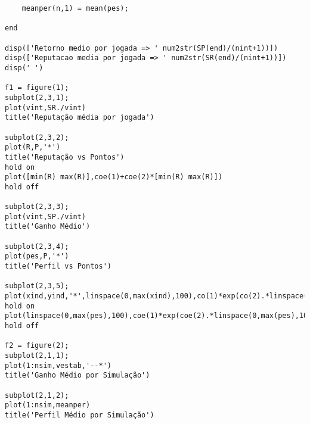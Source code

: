 {\begin{verbatim}
    meanper(n,1) = mean(pes);
    
end

disp(['Retorno medio por jogada => ' num2str(SP(end)/(nint+1))])
disp(['Reputacao media por jogada => ' num2str(SR(end)/(nint+1))])
disp(' ')

f1 = figure(1);
subplot(2,3,1);
plot(vint,SR./vint)
title('Reputação média por jogada')

subplot(2,3,2);
plot(R,P,'*')
title('Reputação vs Pontos')
hold on
plot([min(R) max(R)],coe(1)+coe(2)*[min(R) max(R)])
hold off

subplot(2,3,3);
plot(vint,SP./vint)
title('Ganho Médio')

subplot(2,3,4);
plot(pes,P,'*')
title('Perfil vs Pontos')

subplot(2,3,5);
plot(xind,yind,'*',linspace(0,max(xind),100),co(1)*exp(co(2).*linspace(0,max(xind),100)))
hold on
plot(linspace(0,max(pes),100),coe(1)*exp(coe(2).*linspace(0,max(pes),100)))
hold off

f2 = figure(2);
subplot(2,1,1);
plot(1:nsim,vestab,'--*')
title('Ganho Médio por Simulação')

subplot(2,1,2);
plot(1:nsim,meanper)
title('Perfil Médio por Simulação')

\end{verbatim}}



%
